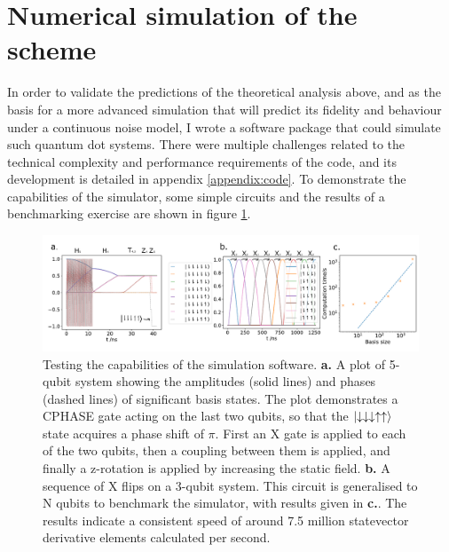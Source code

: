 \documentclass{report}
\begin{document}
 \section{Numerical simulation of the scheme}
 In order to validate the predictions of the theoretical analysis above, and as the basis for a more advanced simulation that will predict its fidelity and behaviour under a continuous noise model, I wrote a software package that could simulate such quantum dot systems. There were multiple challenges related to the technical complexity and performance requirements of the code, and its development is detailed in appendix \ref{appendix:code}. To demonstrate the capabilities of the simulator, some simple circuits and the results of a benchmarking exercise are shown in figure \ref{fig:benchmark}.
\begin{figure}[ht]
    \centering
    \includegraphics[scale = 0.85]{Figures/benchmark/benchmarks.pdf}
    \caption{Testing the capabilities of the simulation software. \textbf{a.} A plot of 5-qubit system showing the amplitudes (solid lines) and phases (dashed lines) of significant basis states. The plot demonstrates a CPHASE gate acting on the last two qubits, so that the $\ket{\downarrow\downarrow\downarrow\uparrow\uparrow}$ state acquires a phase shift of $\pi$. First an X gate is applied to each of the two qubits, then a coupling between them is applied, and finally a z-rotation is applied by increasing the static field\protect\footnotemark. \textbf{b.} A sequence of X flips on a 3-qubit system. This circuit is generalised to N qubits to benchmark the simulator, with results given in \textbf{c.}. The results indicate a consistent speed of around 7.5 million statevector derivative elements calculated per second.}
    \label{fig:benchmark}
\end{figure}
\end{document}
